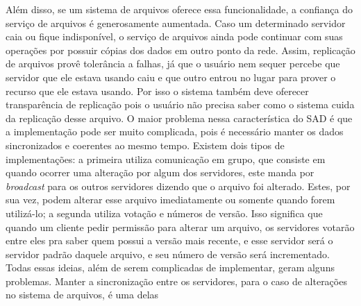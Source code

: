 	
	Além disso, se um sistema de arquivos oferece essa funcionalidade, a confiança do serviço de arquivos é generosamente aumentada.
	Caso um determinado servidor caia ou fique indisponível, o serviço de arquivos ainda pode continuar com suas operações por possuir cópias dos dados em outro ponto da rede.
	Assim, replicação de arquivos provê tolerância a falhas, já que o usuário nem sequer percebe que servidor que ele estava usando caiu e que outro entrou no lugar para prover o recurso que ele estava usando. Por isso o sistema também deve oferecer transparência de replicação pois o usuário não precisa saber como o sistema cuida da replicação desse arquivo.
	O maior problema nessa característica do SAD é que a implementação pode ser muito complicada, pois é necessário manter os dados sincronizados e coerentes ao mesmo tempo.
	Existem dois tipos de implementações: a primeira utiliza comunicação em grupo, que consiste em quando ocorrer uma alteração por algum dos servidores, este manda por \textit{broadcast} para os outros servidores dizendo que o arquivo foi alterado. Estes, por
	sua vez, podem alterar esse arquivo imediatamente ou somente quando forem utilizá-lo; a segunda utiliza votação e números de versão. Isso significa que quando um cliente pedir permissão para alterar um arquivo, os servidores votarão entre eles pra saber quem possui a versão mais recente, e esse servidor será o servidor padrão daquele arquivo, e seu número de versão será incrementado. Todas essas ideias, além de serem complicadas de implementar, geram alguns problemas. Manter a sincronização entre os servidores, para o caso de alterações no sistema de arquivos, é uma delas
	
